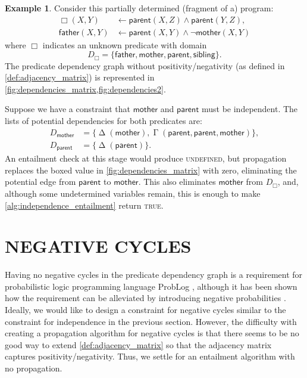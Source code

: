 \documentclass[letterpaper]{article}
\theoremstyle{definition}
\newtheorem{example}{Example}
\DeclareMathOperator{\Determined}{\Delta}
\DeclareMathOperator{\AlmostDetermined}{\Gamma}
\begin{document}
\begin{example} \label{example:independence}
  Consider this partially determined (fragment of a) program:
  \begin{align*}
    \Box(X, Y) &\gets \mathsf{parent}(X, Z) \land \mathsf{parent}(Y, Z),\\
    \mathsf{father}(X, Y) &\gets \mathsf{parent}(X, Y) \land \neg\mathsf{mother}(X, Y)
  \end{align*}
  where $\Box$ indicates an unknown predicate with domain
  \[
    D_\Box = \{ \mathsf{father}, \mathsf{mother}, \mathsf{parent},
    \mathsf{sibling} \}.
  \]
  The predicate dependency graph without positivity/negativity (as defined in
  \cref{def:adjacency_matrix}) is represented in
  \cref{fig:dependencies_matrix,fig:dependencies2}.

  Suppose we have a constraint that $\mathsf{mother}$ and $\mathsf{parent}$ must
  be independent. The lists of potential dependencies for both predicates are:
  \begin{align*}
    D_{\mathsf{mother}} &= \{ \Determined(\mathsf{mother}), \AlmostDetermined(\mathsf{parent}, \mathsf{parent}, \mathsf{mother}) \}, \\
    D_{\mathsf{parent}} &= \{ \Determined(\mathsf{parent}) \}.
  \end{align*}
  An entailment check at this stage would produce \textsc{undefined}, but
  propagation replaces the boxed value in \cref{fig:dependencies_matrix} with
  zero, eliminating the potential edge from $\mathsf{parent}$ to
  $\mathsf{mother}$. This also eliminates $\mathsf{mother}$ from $D_\Box$, and,
  although some undetermined variables remain, this is enough to make
  \cref{alg:independence_entailment} return \textsc{true}.
\end{example}

\section{NEGATIVE CYCLES} \label{sec:cycles}

Having no negative cycles in the predicate dependency graph is a requirement for
probabilistic logic programming language ProbLog \citep{kimmig2009trading},
although it has been shown how the requirement can be alleviated by introducing
negative probabilities \citep{DBLP:journals/ijar/BuchmanP17}. Ideally, we would
like to design a constraint for negative cycles similar to the constraint for
independence in the previous section. However, the difficulty with creating a
propagation algorithm for negative cycles is that there seems to be no good way
to extend \cref{def:adjacency_matrix} so that the adjacency matrix captures
positivity/negativity. Thus, we settle for an entailment algorithm with no
propagation.
\end{document}
